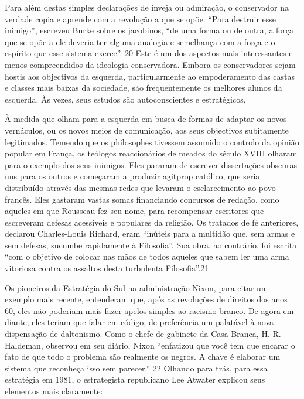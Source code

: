  \par 
Para além destas simples declarações de inveja ou admiração, o conservador na verdade copia e aprende com a revolução a que se opõe. “Para destruir esse inimigo”, escreveu Burke sobre os jacobinos, “de uma forma ou de outra, a força que se opõe a ele deveria ter alguma analogia e semelhança com a força e o espírito que esse sistema exerce”. {\color{blue}20} Este é um dos aspectos mais interessantes e menos compreendidos da ideologia conservadora. Embora os conservadores sejam hostis aos objectivos da esquerda, particularmente ao empoderamento das castas e classes mais baixas da sociedade, são frequentemente os melhores alunos da esquerda. Às vezes, seus estudos são autoconscientes e estratégicos,
 \par 
À medida que olham para a esquerda em busca de formas de adaptar os novos vernáculos, ou os novos meios de comunicação, aos seus objectivos subitamente legitimados. Temendo que os philosophes tivessem assumido o controlo da opinião popular em França, os teólogos reaccionários de meados do século XVIII olharam para o exemplo dos seus inimigos. Eles pararam de escrever dissertações obscuras uns para os outros e começaram a produzir agitprop católico, que seria distribuído através das mesmas redes que levaram o esclarecimento ao povo francês. Eles gastaram vastas somas financiando concursos de redação, como aqueles em que Rousseau fez seu nome, para recompensar escritores que escreveram defesas acessíveis e populares da religião. Os tratados de fé anteriores, declarou Charles-Louis Richard, eram “inúteis para a multidão que, sem armas e sem defesas, sucumbe rapidamente à Filosofia”. Sua obra, ao contrário, foi escrita “com o objetivo de colocar nas mãos de todos aqueles que sabem ler uma arma vitoriosa contra os assaltos desta turbulenta Filosofia”.{\color{blue}21}
 \par 
Os pioneiros da Estratégia do Sul na administração Nixon, para citar um exemplo mais recente, entenderam que, após as revoluções de direitos dos anos 60, eles não poderiam mais fazer apelos simples ao racismo branco. De agora em diante, eles teriam que falar em código, de preferência um palatável à nova dispensação de daltonismo. Como o chefe de gabinete da Casa Branca, H. R. Haldeman, observou em seu diário, Nixon “enfatizou que você tem que encarar o fato de que todo o problema são realmente os negros. A chave é elaborar um sistema que reconheça isso sem parecer.” {\color{blue}22} Olhando para trás, para essa estratégia em 1981, o estrategista republicano Lee Atwater explicou seus elementos mais claramente:
